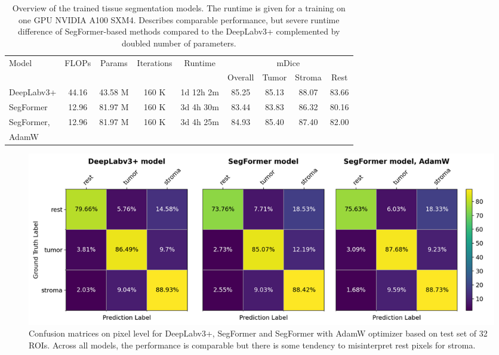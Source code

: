 \begin{table}[H]
    \centering
    \begin{tabular}{ l c c c c c c c c}
        \hline
        \multirow{2}{*}{Model} & \multirow{2}{*}{FLOPs} & \multirow{2}{*}{Params} & \multirow{2}{*}{Iterations} & \multirow{2}{*}{Runtime} & \multicolumn{4}{c}{mDice}\\
        & & & & & Overall & Tumor & Stroma & Rest \\
        \hline
        DeepLabv3+ & 44.16 & 43.58 M & 160 K & 1d 12h 2m & 85.25 & 85.13 & 88.07 & 83.66\\
        SegFormer & 12.96 & 81.97 M & 160 K  & 3d 4h 30m & 83.44 & 83.83 & 86.32 & 80.16\\
        SegFormer, & \multirow{2}{*}{12.96} & \multirow{2}{*}{81.97 M} & \multirow{2}{*}{160 K} & \multirow{2}{*}{3d 4h 25m} & \multirow{2}{*}{84.93} & \multirow{2}{*}{85.40} & \multirow{2}{*}{87.40} & \multirow{2}{*}{82.00}\\
        AdamW & & & & & & & & \\
        \hline
    \end{tabular}
\caption{\label{tab:tissue_perform} Overview of the trained tissue segmentation models. The runtime is given for a training on one GPU NVIDIA A100 SXM4.
Describes comparable performance, but severe runtime difference of
SegFormer-based methods compared to the DeepLabv3+ complemented by doubled number of parameters.}
\end{table}

\begin{figure}[H]
    \includegraphics[width=\linewidth]{figures/tissue/conf_matrices.png}
    \caption{Confusion matrices on pixel level for DeepLabv3+, SegFormer and SegFormer with AdamW optimizer
    based on test set of 32 ROIs. Across all models, the performance
    is comparable but there is some tendency to misinterpret rest pixels for stroma.}
    \label{fig:tissue_confusion}
\end{figure}

